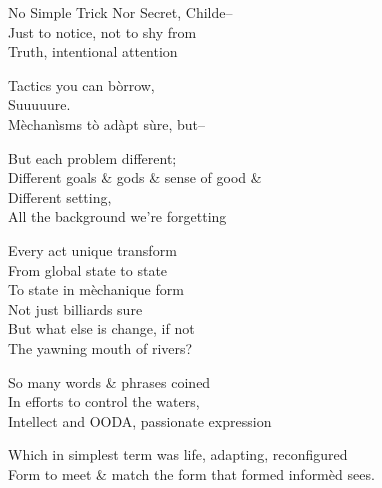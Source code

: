 No Simple Trick Nor Secret, Childe-- \\
Just to notice, not to shy from \\
Truth, intentional attention

Tactics you can bòrrow, \\
Suuuuure. \\
Mèchanìsms tò adàpt sùre, but--

But each problem different; \\
Different goals \& gods \& sense of good \& \\
Different setting, \\
All the background we're forgetting

Every act unique transform \\
From global state to state \\
To state in mèchanique form \\
Not just billiards sure \\
But what else is change, if not \\
The yawning mouth of rivers?

So many words \& phrases coined \\
In efforts to control the waters, \\
Intellect and OODA, passionate expression

Which in simplest term was life, adapting, reconfigured \\
Form to meet \& match the form that formed informèd sees.
